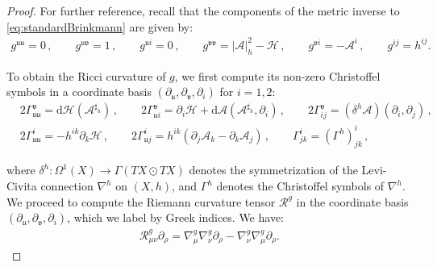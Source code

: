 \documentclass[10pt,a4paper,twoside,reqno]{amsart}
\theoremstyle{plain}
\theoremstyle{definition}
\theoremstyle{remark}
\def\dd{\mathrm{d}}
\def\cR{{\mathcal R}}
\def\cH{\mathcal{H}}
\def\cA{\mathcal{A}}
\def\cH{\mathcal{H}}
\def\dd{\mathrm{d}}
\def\fru{\mathfrak{u}}
\def\frv{\mathfrak{v}}
\begin{document}
\begin{proof}
For further reference, recall that the components of the metric inverse to \eqref{eq:standardBrinkmann} are given by:
\begin{eqnarray*}
g^{\fru\fru} = 0 \, , \qquad g^{\fru\frv} = 1 \, , \qquad g^{\fru i} = 0 \, , \qquad
g^{\frv\frv} = \vert\cA\vert^2_h -\cH \, , \qquad g^{\frv i} = -\cA^i \, , \qquad g^{ij} = h^{ij}.
\end{eqnarray*}

\noindent
To obtain the Ricci curvature of $g$, we first compute its non-zero Christoffel symbols in a coordinate basis $(\partial_{\fru},\partial_{\frv},\partial_i)$ for $i=1,2$:
\begin{eqnarray*}
\label{eq:christoffel_stationary}
& 2\Gamma^{\frv}_{\fru\fru} = \dd \cH(\cA^{\sharp_h}) \, , \qquad  2 \Gamma^{\frv}_{\fru i} = \partial_i \cH + \dd \cA (\cA^{\sharp_h},\partial_i) \, , \qquad 2 \Gamma^{\frv}_{ij}= (\delta^h\cA)(\partial_i , \partial_j) \, , \\%
& 2\Gamma_{\fru\fru}^i = -  h^{ik} \partial_k\cH \, , \qquad 2 \Gamma^i_{\fru j} =   h^{ik} \left( \partial_j \cA_{k} - \partial_k \cA_{j} \right) \, , \qquad
\Gamma^{i}_{jk} = (\Gamma^{h})^{i}_{jk} \, ,
\end{eqnarray*}

\noindent
where $\delta^{h}\colon \Omega^1(X) \to \Gamma(TX\odot TX)$ denotes the symmetrization of the Levi-Civita connection $\nabla^{h}$ on $(X , h)$, and $\Gamma^{h}$ denotes the Christoffel symbols of $\nabla^{h}$. We proceed to compute the Riemann curvature tensor $\cR^g$ in the coordinate basis $(\partial_{\fru},\partial_{\frv},\partial_i)$, which we label by Greek indices. We have:
\begin{eqnarray*}
\cR^g_{\mu\nu}\partial_{\rho} = \nabla^g_{\mu}\nabla^g_{\nu} \partial_{\rho} - \nabla^g_{\nu}\nabla^g_{\mu} \partial_{\rho}.
\end{eqnarray*}


\end{proof}
\end{document}
